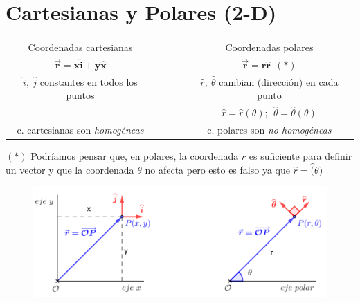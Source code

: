 \color{black}


\section{Cartesianas y Polares (2-D)}
\vspace{0.5cm}

\begin{table}[H]
\centering
\begin{tabular}{ccc}
Coordenadas cartesianas & $\qquad$ & Coordenadas polares \\
$\boldsymbol{ \vec r=x\widehat i+y\widehat x}$ &  & $\boldsymbol{ \vec r=r\widehat r} \ \ (*)$ \\
$\widehat i,\ \widehat j$ constantes en todos los puntos &  & $\widehat r,\ \widehat \theta$ cambian (dirección) en cada punto \\
 & & $\widehat r=\widehat r (\theta);\ \ \widehat \theta= \widehat \theta(\theta)$ \\
c. cartesianas son \emph{homogéneas} &  & c. polares son \emph{no-homogéneas} 
\end{tabular}
\end{table}

$(*)$ Podríamos pensar que, en polares, la coordenada $r$ es suficiente para definir un vector y que la coordenada $\theta$ no afecta pero esto es falso ya que $\widehat r=\widehat(\theta)$

\begin{figure}[H]
	\centering
	\includegraphics[width=.8\textwidth]{img-coordenadas/coordenadas-02.png}
\end{figure}	


